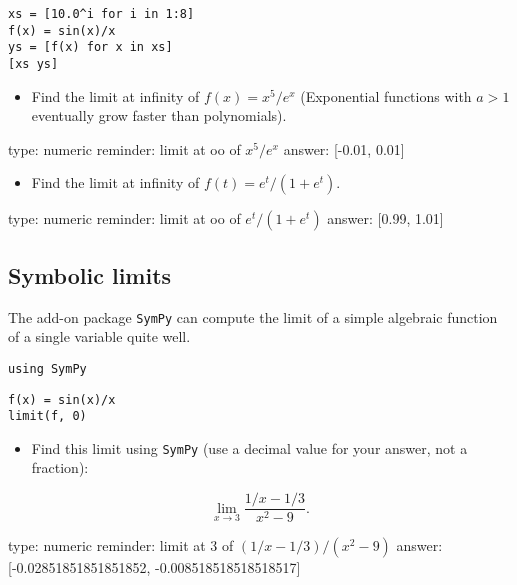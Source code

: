 \documentclass[12pt]{article}
\begin{document}
\begin{verbatim}
xs = [10.0^i for i in 1:8]
f(x) = sin(x)/x
ys = [f(x) for x in xs]
[xs ys]
\end{verbatim}
\begin{itemize}
\itemsep1pt\parskip0pt
\item
  Find the limit at infinity of $f(x) = x^5/e^x$ (Exponential functions
  with $a>1$ eventually grow faster than polynomials).
\end{itemize}

\begin{answer}
    type: numeric
    reminder: limit at oo of \( x^5/e^x \)
    answer: [-0.01, 0.01]

\end{answer}

\begin{itemize}
\itemsep1pt\parskip0pt
\item
  Find the limit at infinity of $f(t) = e^t / (1 + e^t)$.
\end{itemize}

\begin{answer}
    type: numeric
    reminder: limit at oo of \( e^t / (1 + e^t) \)
    answer: [0.99, 1.01]

\end{answer}

\subsection{Symbolic limits}

The add-on package \texttt{SymPy} can compute the limit of a simple
algebraic function of a single variable quite well.



\begin{verbatim}
using SymPy
\end{verbatim}


\begin{verbatim}
f(x) = sin(x)/x
limit(f, 0)
\end{verbatim}
\begin{itemize}
\itemsep1pt\parskip0pt
\item
  Find this limit using \texttt{SymPy} (use a decimal value for your
  answer, not a fraction):
\end{itemize}

\[
\lim_{x \rightarrow 3} \frac{1/x - 1/3}{x^2 - 9}.
\]

\begin{answer}
    type: numeric
    reminder: limit at 3 of \( (1/x - 1/3) / (x^2 - 9) \)
    answer: [-0.02851851851851852, -0.008518518518518517]

\end{answer}
\end{document}
